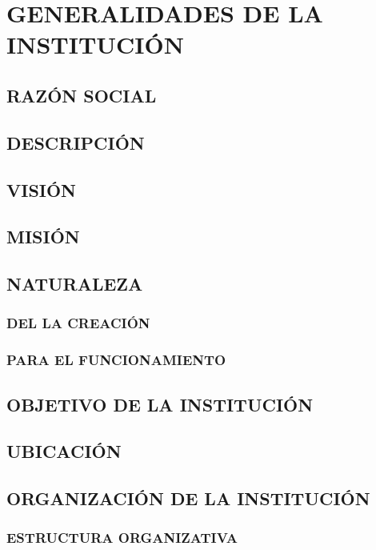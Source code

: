 \chapter{GENERALIDADES DE LA INSTITUCIÓN}

\section{RAZÓN SOCIAL}

\section{DESCRIPCIÓN}

\section{VISIÓN}

\section{MISIÓN}

\section{NATURALEZA}

\subsection{DEL LA CREACIÓN}
\subsection{PARA EL FUNCIONAMIENTO}

\section{OBJETIVO DE LA INSTITUCIÓN}

\section{UBICACIÓN}

\section{ORGANIZACIÓN DE LA INSTITUCIÓN}

\subsection{ESTRUCTURA ORGANIZATIVA}
